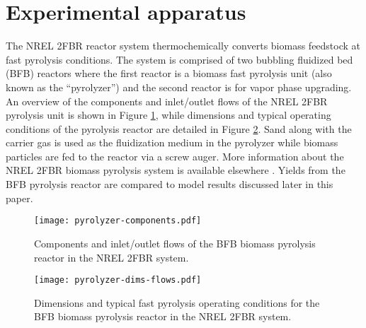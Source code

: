 
\section{Experimental apparatus}

The NREL 2FBR reactor system thermochemically converts biomass feedstock at fast pyrolysis conditions. The system is comprised of two bubbling fluidized bed (BFB) reactors where the first reactor is a biomass fast pyrolysis unit (also known as the ``pyrolyzer'') and the second reactor is for vapor phase upgrading. An overview of the components and inlet/outlet flows of the NREL 2FBR pyrolysis unit is shown in Figure \ref{fig:pyrolyzer-components}, while dimensions and typical operating conditions of the pyrolysis reactor are detailed in Figure \ref{fig:pyrolyzer-dims-flows}. Sand along with the carrier gas is used as the fluidization medium in the pyrolyzer while biomass particles are fed to the reactor via a screw auger. More information about the NREL 2FBR biomass pyrolysis system is available elsewhere \cite{Howe-2015, Trendewicz-2015}. Yields from the BFB pyrolysis reactor are compared to model results discussed later in this paper.

\begin{figure}[H]
    \centering
    \texttt{[image: pyrolyzer-components.pdf]}
    \caption{Components and inlet/outlet flows of the BFB biomass pyrolysis reactor in the NREL 2FBR system.}
    \label{fig:pyrolyzer-components}
\end{figure}

\begin{figure}[H]
    \centering
    \texttt{[image: pyrolyzer-dims-flows.pdf]}
    \caption{Dimensions and typical fast pyrolysis operating conditions for the BFB biomass pyrolysis reactor in the NREL 2FBR system.}
    \label{fig:pyrolyzer-dims-flows}
\end{figure}
